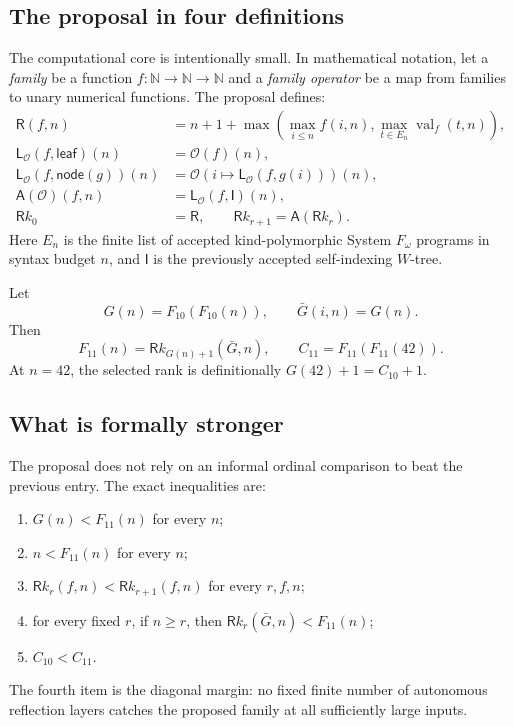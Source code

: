 \documentclass[11pt,oneside]{article}
\theoremstyle{definition}
\newcommand{\Nat}{\mathbb N}
\newcommand{\Op}{\mathcal O}
\newcommand{\Index}{\mathsf I}
\newcommand{\Leaf}{\mathsf{leaf}}
\newcommand{\Node}{\mathsf{node}}
\newcommand{\Reflect}{\mathsf R}
\newcommand{\Lift}{\mathsf L}
\newcommand{\Auto}{\mathsf A}
\newcommand{\Ram}{\mathsf Rk}
\begin{document}
\subsection{The proposal in four definitions}

The computational core is intentionally small.  In mathematical notation,
let a \emph{family} be a function $f:\Nat\to\Nat\to\Nat$ and a
\emph{family operator} be a map from families to unary numerical functions.
The proposal defines:
\begin{align*}
  \Reflect(f,n)
    &= n+1+\max\!\left(
       \max_{i\le n}f(i,n),
       \max_{t\in E_n}\operatorname{val}_{f}(t,n)
       \right),\\
  \Lift_{\Op}(f,\Leaf)(n)
    &=\Op(f)(n),\\
  \Lift_{\Op}(f,\Node(g))(n)
    &=\Op\!\left(i\mapsto \Lift_{\Op}(f,g(i))\right)(n),\\
  \Auto(\Op)(f,n)
    &=\Lift_{\Op}(f,\Index)(n),\\
  \Ram_0&=\Reflect,\qquad
  \Ram_{r+1}=\Auto(\Ram_r).
\end{align*}
Here $E_n$ is the finite list of accepted kind-polymorphic System
$F_\omega$ programs in syntax budget $n$, and $\Index$ is the previously
accepted self-indexing $W$-tree.

Let
\[
 G(n)=F_{10}(F_{10}(n)),\qquad \bar G(i,n)=G(n).
\]
Then
\begin{equation}\label{eq:F11}
 F_{11}(n)=\Ram_{G(n)+1}(\bar G,n),
 \qquad
 C_{11}=F_{11}(F_{11}(42)).
\end{equation}
At $n=42$, the selected rank is definitionally
$G(42)+1=C_{10}+1$.

\subsection{What is formally stronger}

The proposal does not rely on an informal ordinal comparison to beat the
previous entry.  The exact inequalities are:
\begin{enumerate}
  \item $G(n)<F_{11}(n)$ for every $n$;
  \item $n<F_{11}(n)$ for every $n$;
  \item $\Ram_r(f,n)<\Ram_{r+1}(f,n)$ for every $r,f,n$;
  \item for every fixed $r$, if $n\ge r$, then
        $\Ram_r(\bar G,n)<F_{11}(n)$;
  \item $C_{10}<C_{11}$.
\end{enumerate}
The fourth item is the diagonal margin: no fixed finite number of autonomous
reflection layers catches the proposed family at all sufficiently large
inputs.
\end{document}
